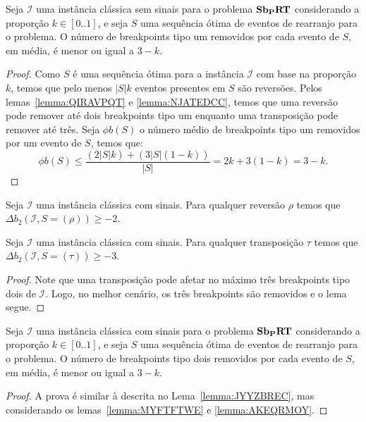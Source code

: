 \begin{lemma}\label{lemma:JYYZBREC}
Seja $\mathcal{I}$ uma instância clássica sem sinais para o problema $\textbf{Sb\textsubscript{P}RT}{}$ considerando a proporção $k \in [0..1]$, e seja $S$ uma sequência ótima de eventos de rearranjo para o problema. O número de breakpoints tipo um removidos por cada evento de $S$, em média, é menor ou igual a $3-k$.
\end{lemma}
\begin{proof}
Como $S$ é uma sequência ótima para a instância $\mathcal{I}$ com base na proporção $k$, temos que pelo menos $|S|k$ eventos presentes em $S$ são reversões. Pelos lemas~\ref{lemma:QIRAVPQT} e \ref{lemma:NJATEDCC}, temos que uma reversão pode remover até dois breakpoints tipo um enquanto uma transposição pode remover até três. Seja $\phi b(S)$ o número médio de breakpoints tipo um removidos por um evento de $S$, temos que:
$$\phi b(S) \le \frac{(2 |S| k) + (3 |S| (1 - k))}{|S|} = 2k + 3(1 - k) = 3 - k.$$ 
\end{proof}

\begin{lemma}\label{lemma:MYFTFTWE}
Seja $\mathcal{I}$ uma instância clássica com sinais. Para qualquer reversão $\rho$ temos que $\Delta b_2(\mathcal{I}, S = (\rho)) \ge -2$.
\end{lemma}

\begin{lemma}\label{lemma:AKEQRMOY}
Seja $\mathcal{I}$ uma instância clássica com sinais. Para qualquer transposição $\tau$ temos que $\Delta b_2(\mathcal{I}, S = (\tau)) \ge -3$.
\end{lemma}
\begin{proof}
Note que uma transposição pode afetar no máximo três breakpoints tipo dois de $\mathcal{I}$. Logo, no melhor cenário, os três breakpoints são removidos e o lema segue.
\end{proof}

\begin{lemma}\label{lemma:ZZLNPRWJ}
Seja $\mathcal{I}$ uma instância clássica com sinais para o problema $\textbf{Sb\textsubscript{P}RT}{}$ considerando a proporção $k \in [0..1]$, e seja $S$ uma sequência ótima de eventos de rearranjo para o problema. O número de breakpoints tipo dois removidos por cada evento de $S$, em média, é menor ou igual a $3-k$.
\end{lemma}
\begin{proof}
A prova é similar à descrita no Lema~\ref{lemma:JYYZBREC}, mas considerando os lemas~\ref{lemma:MYFTFTWE} e \ref{lemma:AKEQRMOY}.
\end{proof}

